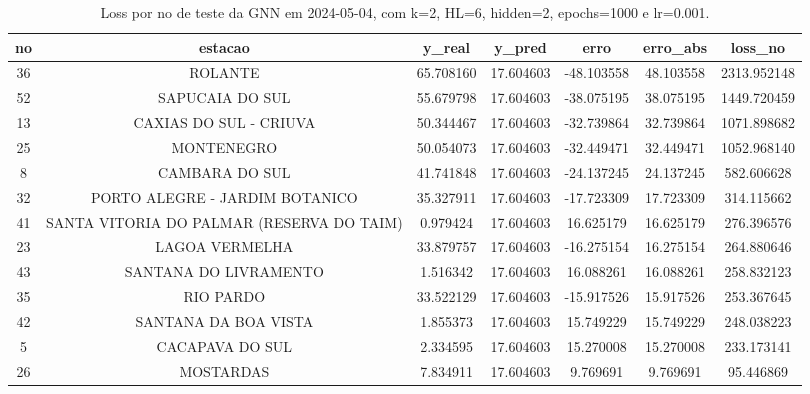 \begin{table}[h]
\centering
\caption{Loss por no de teste da GNN em 2024-05-04, com k=2, HL=6, hidden=2, epochs=1000 e lr=0.001.}
\label{tab:gnn_loss_k2_hl6_h2_e1000_d20240504}
\begin{tabular}{ccccccc}
\toprule
no & estacao & y\_real & y\_pred & erro & erro\_abs & loss\_no \\
\midrule
36 & ROLANTE & 65.708160 & 17.604603 & -48.103558 & 48.103558 & 2313.952148 \\
52 & SAPUCAIA DO SUL & 55.679798 & 17.604603 & -38.075195 & 38.075195 & 1449.720459 \\
13 & CAXIAS DO SUL - CRIUVA & 50.344467 & 17.604603 & -32.739864 & 32.739864 & 1071.898682 \\
25 & MONTENEGRO & 50.054073 & 17.604603 & -32.449471 & 32.449471 & 1052.968140 \\
8 & CAMBARA DO SUL & 41.741848 & 17.604603 & -24.137245 & 24.137245 & 582.606628 \\
32 & PORTO ALEGRE - JARDIM BOTANICO & 35.327911 & 17.604603 & -17.723309 & 17.723309 & 314.115662 \\
41 & SANTA VITORIA DO PALMAR (RESERVA DO TAIM) & 0.979424 & 17.604603 & 16.625179 & 16.625179 & 276.396576 \\
23 & LAGOA VERMELHA & 33.879757 & 17.604603 & -16.275154 & 16.275154 & 264.880646 \\
43 & SANTANA DO LIVRAMENTO & 1.516342 & 17.604603 & 16.088261 & 16.088261 & 258.832123 \\
35 & RIO PARDO & 33.522129 & 17.604603 & -15.917526 & 15.917526 & 253.367645 \\
42 & SANTANA DA BOA VISTA & 1.855373 & 17.604603 & 15.749229 & 15.749229 & 248.038223 \\
5 & CACAPAVA DO SUL & 2.334595 & 17.604603 & 15.270008 & 15.270008 & 233.173141 \\
26 & MOSTARDAS & 7.834911 & 17.604603 & 9.769691 & 9.769691 & 95.446869 \\
\bottomrule
\end{tabular}
\end{table}

